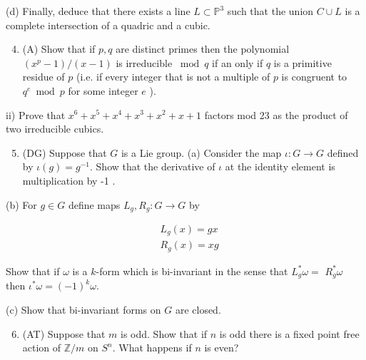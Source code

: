\documentclass[10pt]{article}
\begin{document}
(d) Finally, deduce that there exists a line $L \subset \mathbb{P}^{3}$ such that the union $C \cup L$ is a complete intersection of a quadric and a cubic.

\begin{enumerate}
  \setcounter{enumi}{3}
  \item (A) Show that if $p, q$ are distinct primes then the polynomial $\left(x^{p}-1\right) /(x-1)$ is irreducible $\bmod q$ if an only if $q$ is a primitive residue of $p$ (i.e. if every integer that is not a multiple of $p$ is congruent to $q^{e} \bmod p$ for some integer $e$ ).
\end{enumerate}

ii) Prove that $x^{6}+x^{5}+x^{4}+x^{3}+x^{2}+x+1$ factors mod 23 as the product of two irreducible cubics.

\begin{enumerate}
  \setcounter{enumi}{4}
  \item (DG) Suppose that $G$ is a Lie group.
(a) Consider the map $\iota: G \rightarrow G$ defined by $\iota(g)=g^{-1}$. Show that the derivative of $\iota$ at the identity element is multiplication by -1 .
\end{enumerate}

(b) For $g \in G$ define maps $L_{g}, R_{g}: G \rightarrow G$ by

$$
\begin{aligned}
& L_{g}(x)=g x \\
& R_{g}(x)=x g
\end{aligned}
$$

Show that if $\omega$ is a $k$-form which is bi-invariant in the sense that $L_{g}^{*} \omega=$ $R_{g}^{*} \omega$ then $\iota^{*} \omega=(-1)^{k} \omega$.

(c) Show that bi-invariant forms on $G$ are closed.

\begin{enumerate}
  \setcounter{enumi}{5}
  \item (AT) Suppose that $m$ is odd. Show that if $n$ is odd there is a fixed point free action of $\mathbb{Z} / m$ on $S^{n}$. What happens if $n$ is even?
\end{enumerate}
\end{document}
